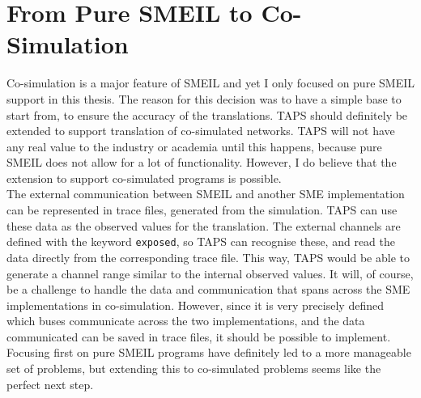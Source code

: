 \section{From Pure SMEIL to Co-Simulation}
Co-simulation is a major feature of SMEIL and yet I only focused on pure SMEIL support in this thesis. The reason for this decision was to have a simple base to start from, to ensure the accuracy of the translations.
TAPS should definitely be extended to support translation of co-simulated networks. TAPS will not have any real value to the industry or academia until this happens, because pure SMEIL does not allow for a lot of functionality.
However, I do believe that the extension to support co-simulated programs is possible.\\

The external communication between SMEIL and another SME implementation can be represented in trace files, generated from the simulation. TAPS can use these data as the observed values for the translation. The external channels are defined with the keyword \texttt{exposed}, so TAPS can recognise these, and read the data directly from the corresponding trace file. This way, TAPS would be able to generate a channel range similar to the internal observed values.
It will, of course, be a challenge to handle the data and communication that spans across the SME implementations in co-simulation. However, since it is very precisely defined which buses communicate across the two implementations, and the data communicated can be saved in trace files, it should be possible to implement.\\

Focusing first on pure SMEIL programs have definitely led to a more manageable set of problems, but extending this to co-simulated problems seems like the perfect next step.

